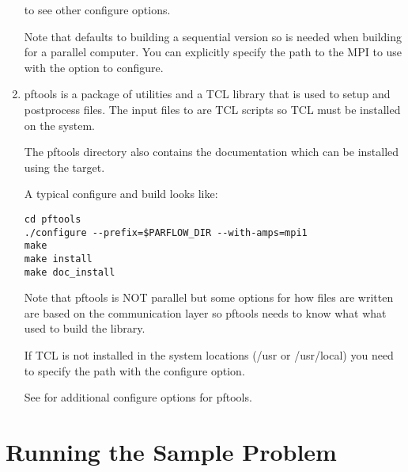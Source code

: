 \begin{enumerate}
to see other configure options.   

Note that \parflow{} defaults to building a sequential version so
 is needed when building for a parallel computer.  You
can explicitly specify the path to the MPI to use with the
 option to configure.

\item

pftools is a package of utilities and a TCL library that is used to
setup and postprocess \parflow{} files.  The input files to \parflow{} are
TCL scripts so TCL must be installed on the system.

The pftools directory also contains the documentation which can be
installed using the  target.

A typical configure and build looks like:

\begin{display}\begin{verbatim}
cd pftools
./configure --prefix=$PARFLOW_DIR --with-amps=mpi1
make 
make install
make doc_install
\end{verbatim}\end{display}

Note that pftools is NOT parallel but some options for how files are
written are based on the communication layer so pftools needs to know
what what used to build the \parflow{} library.

If TCL is not installed in the system locations (/usr or /usr/local) you need
to specify the path with the  configure option.

See  for additional configure options for pftools.

\end{enumerate}


\section{Running the Sample Problem}
\label{Running the Sample Problem}

